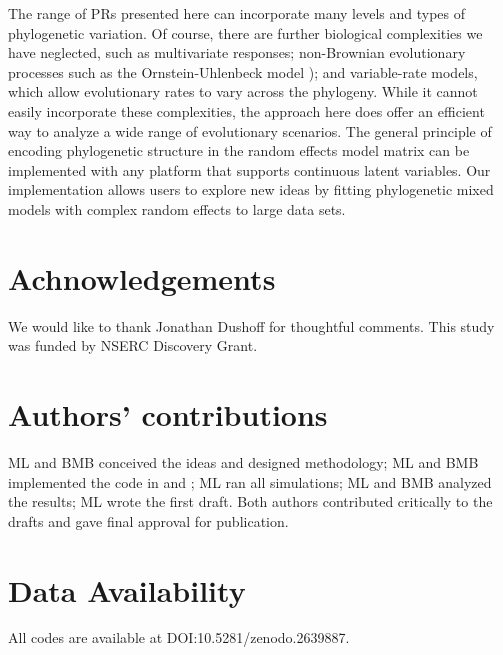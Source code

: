 \documentclass[12pt]{article}
\begin{document}
The range of PRs presented here can incorporate many levels and types of phylogenetic variation.
Of course, there are further biological complexities we have neglected, such as multivariate responses; non-Brownian evolutionary processes such as the Ornstein-Uhlenbeck model \citep{butler2004phylogenetic}); and variable-rate models, which allow evolutionary rates to vary across the phylogeny.
While it cannot easily incorporate these complexities, the approach here does offer an efficient way to analyze a wide range of evolutionary scenarios.
The general principle of encoding phylogenetic structure in the random effects model matrix can be implemented with any platform that supports continuous latent variables.
Our implementation allows users to explore new ideas by fitting phylogenetic mixed models with complex random effects to large data sets.

\section*{Achnowledgements}

We would like to thank Jonathan Dushoff for thoughtful comments.
This study was funded by NSERC Discovery Grant.

\section*{Authors’ contributions}

ML and BMB conceived the ideas and designed methodology; ML and BMB implemented the code in  and ; ML ran all simulations; ML and BMB analyzed the results; ML wrote the first draft. Both authors contributed critically to the drafts and gave final approval for publication.

\section*{Data Availability}

All codes are available at DOI:10.5281/zenodo.2639887.


\end{document}
